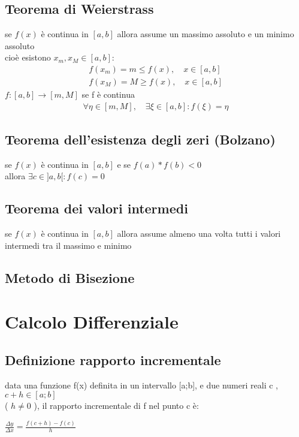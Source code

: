 \documentclass[a4paper,11pt]{article}
\begin{document}
\subsection{Teorema di Weierstrass}

\label{sec:Weierstrass}

se \(f(x)\) è continua in \([a,b]\) allora assume un massimo assoluto e un minimo assoluto 
\\
cioè esistono \(x_m , x_M \in [a,b]:\)
\begin{align*}
    f(x_m) = m \leq f(x) , \quad x\in [a,b]
    \\
    f(x_M) = M \geq f(x) , \quad x\in [a,b]
\end{align*}
 \(f:[a,b] \rightarrow [m,M]\) se f è continua
\\
\begin{align*}
    \forall \eta \in [m,M] , \quad \exists \xi \in [a,b] : f(\xi) = \eta
\end{align*}

\subsection{Teorema dell'esistenza degli zeri (Bolzano)}

se \(f(x)\) è continua in \([a,b]\) e se \(f(a) * f(b) < 0 \)
\\
allora \( \exists c \in ]a,b[ : f(c) = 0\)

\subsection{Teorema dei valori intermedi}

se \(f(x)\) è continua in \([a,b]\) allora assume almeno una volta tutti i valori intermedi tra il massimo e minimo

\subsection{Metodo di Bisezione}











\section{Calcolo Differenziale}

\subsection{Definizione rapporto incrementale}
data una funzione f(x) definita in un intervallo [a;b], e due numeri reali c , \(c+h \in [a;b]\) \\
 ( \(h \neq 0\) ), il rapporto incrementale di f nel punto c è:
\begin{center}
\(
    \frac{\varDelta y}{\varDelta x} = \frac{f(c+h) - f(c)}{h}
\)    
\end{center}
\end{document}
